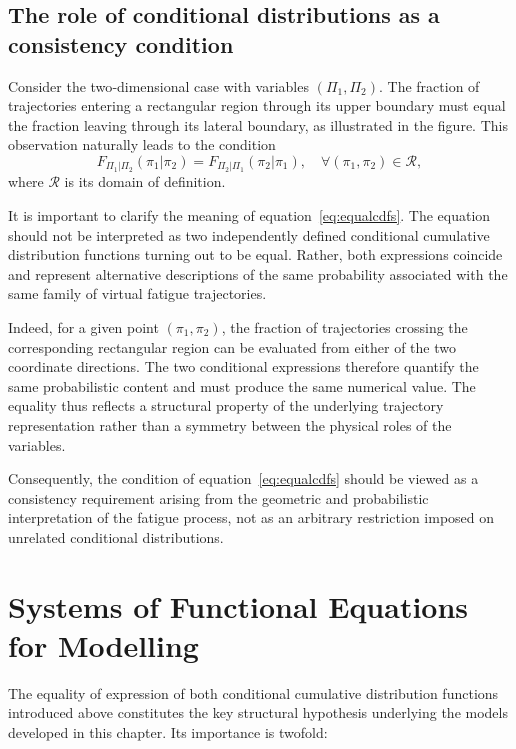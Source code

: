 \subsection{The role of conditional distributions as a consistency condition}

Consider the two‑dimensional case with variables $(\Pi_1,\Pi_2)$. The fraction of trajectories entering a rectangular region through its upper boundary must equal the fraction leaving through its lateral boundary, as illustrated in the figure. This observation naturally leads to the condition
\begin{equation}
F_{\Pi_1|\Pi_2}(\pi_1|\pi_2) = F_{\Pi_2|\Pi_1}(\pi_2|\pi_1), \quad \forall (\pi_1,\pi_2) \in \mathcal{R},
\label{eq:equalcdfs}
\end{equation}
where $\mathcal{R}$ is its domain of definition.

It is important to clarify the meaning of equation~\eqref{eq:equalcdfs}. The equation should not be interpreted as two independently defined conditional cumulative distribution functions turning out to be equal. Rather, both expressions coincide and represent alternative descriptions of the same probability associated with the same family of virtual fatigue trajectories.

Indeed, for a given point $(\pi_1,\pi_2)$, the fraction of trajectories crossing the corresponding rectangular region can be evaluated from either of the two coordinate directions. The two conditional expressions therefore quantify the same probabilistic content and must produce the same numerical value. The equality thus reflects a structural property of the underlying trajectory representation rather than a symmetry between the physical roles of the variables.

Consequently, the condition of equation~\eqref{eq:equalcdfs} should be viewed as a consistency requirement arising from the geometric and probabilistic interpretation of the fatigue process, not as an arbitrary restriction imposed on unrelated conditional distributions.


\section{Systems of Functional Equations for Modelling}
\label{sec:equality-conditional}

The equality of expression of both conditional cumulative distribution functions introduced above constitutes the key structural hypothesis underlying the models developed in this chapter. Its importance is twofold:


